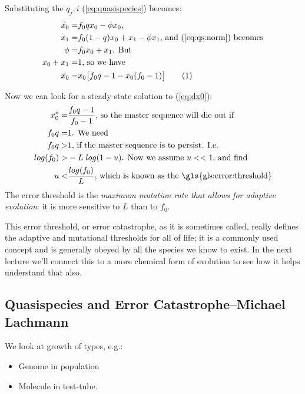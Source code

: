 \documentclass[]{article}
\newcommand\numberthis{\addtocounter{equation}{1}\tag{\theequation}}
\begin{document}
Substituting the $q_j,i$ (\ref{eq:quasispecies}) becomes:
\begin{align*}
	\dot{x_0}=&f_0 q x_0 - \phi x_0\text{,}\\
	\dot{x_1}=&f_0 (1-q) x_0 + x_1 -\phi x_1\text{, and (\ref{eq:qs:norm}) becomes}\\
	\phi =& f_0 x_0 + x_1 \text{. But} \\
	x_0 + x_1 =& 1\text{, so we have}\\
	\dot{x_0}=& x_0 \big[f_0 q -1 - x_0 (f_0 - 1)\big] \numberthis \label{eq:dx0}
\end{align*}

Now we can look for a steady state solution to (\ref{eq:dx0}):
\begin{align*}
	x_0^* =& \frac{f_0 q - 1}{f_0 - 1} \text{, so the master sequence will die out if}\\
	f_0 q =& 1 \text{. We need}\\
	f_0q >& 1 \text{, if the master sequence is to persist. I.e.}\\
	log(f_0) >& -L\; log(1-u)\text{. Now we assume $u<<1$, and find}\\
	u <& \frac{log(f_0)}{L}\text{, which is known as the \gls{gls:error:threshold}} 
\end{align*}
The error threshold is the \emph{maximum mutation rate that allows for adaptive evolution}: it is more sensitive to $L$ than to $f_0$.

This error threshold, or error catastrophe, as it is sometimes called, really defines the adaptive and mutational thresholds for all of life; it is a commonly used concept and is generally obeyed by all the species we know to exist. In the next lecture we'll connect this to a more chemical form of evolution to see how it helps understand that also.

\subsection[Quasispecies and Error Catastrophe]{Quasispecies and Error Catastrophe--Michael Lachmann}

We look at growth of types, e.g.:
\begin{itemize}
	\item Genome in population
	\item Molecule in test-tube.
\end{itemize}
\end{document}
